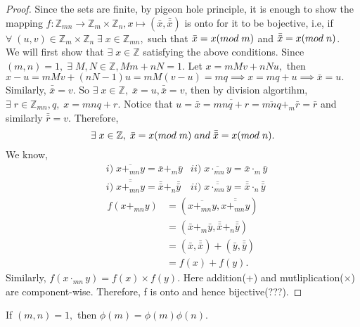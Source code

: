 \documentclass[10pt,a4paper]{article}
\begin{document}
\begin{proof}
Since the sets are finite, by pigeon hole principle, it is enough to show the mapping $f:\mathbb{Z}_{mn}\rightarrow\mathbb{Z}_m\times\mathbb{Z}_n,x\mapsto(\bar{x},\bar{\bar{x}})$ is onto for it to be bojective, i.e, if $\forall\;(u,v)\in\mathbb{Z}_m\times\mathbb{Z}_n\;\exists\;x\in\mathbb{Z}_{mn},$ such that $\bar{x}=x(mod\;m)$ and $\bar{\bar{x}}=x(mod\;n)$. \\
We will first show that $\exists\;x\in\mathbb{Z}$ satisfying the above conditions. Since $(m,n)=1,\;\exists\;M,N\in\mathbb{Z},Mm+nN=1.$ Let $x=mMv+nNu,$ then $x-u=mMv+(nN-1)u=mM(v-u)=mq\implies x=mq+u\implies \bar{x}=u.$ Similarly, $\bar{\bar{x}}=v.$ So $\exists\;x\in\mathbb{Z},\;\bar{x}=u,\bar{\bar{x}}=v$, then by division algortihm, $\exists\;r\in\mathbb{Z}_{mn},q,\;x=mnq+r.$ Notice that $u=\bar{x}=\overline{mnq+r}=\overline{mnq}+_m\bar{r}=\bar{r}$ and similarly $\bar{\bar{r}}=v.$ Therefore, $$\exists\;x\in\mathbb{Z},\;\bar{x}=x(mod\;m)\;and\;\bar{\bar{x}}=x(mod\;n).$$
We know,
\begin{align*}
&i)\;\overline{x+_{mn}y}=\bar{x}+_m\bar{y} &ii)\;\overline{x\cdot_{mn}y}=\bar{x}\cdot_m\bar{y} \\
&i)\;\overline{\overline{x+_{mn}y}}=\bar{\bar{x}}+_n\bar{\bar{y}} &ii)\;\overline{\overline{x\cdot_{mn}y}}=\bar{\bar{x}}\cdot_n\bar{\bar{y}} 
\end{align*}
\begin{align*}
f(x+_{mn}y)&=(\overline{x+_{mn}y},\overline{\overline{x+_{mn}y}})\\
&=(\bar{x}+_m\bar{y},\bar{\bar{x}}+_n\bar{\bar{y}})\\
&=(\bar{x},\bar{\bar{x}})+(\bar{y},\bar{\bar{y}})\\
&=f(x)+f(y).
\end{align*}
Similarly, $f(x\cdot_{mn}y)=f(x)\times f(y)$. Here addition(+) and mutliplication($\times$) are component-wise. Therefore, f is onto and hence bijective(???).
\end{proof}


\begin{theorem}
If $(m,n)=1,$ then $\phi(m)=\phi(m)\phi(n)$.
\end{theorem}
\end{document}
